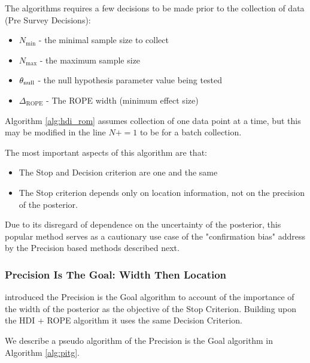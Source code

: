 The algorithms requires a few decisions to be made prior to the collection of data (Pre Survey Decisions):

\begin{itemize}
    \item $N_\mathrm{min}$ - the minimal sample size to collect
    \item $N_\mathrm{max}$ - the maximum sample size
    \item $\theta_{\rm null}$ - the null hypothesis parameter value being tested
    \item $\Delta_\mathrm{ROPE}$ - The ROPE width (minimum effect size)
\end{itemize}

Algorithm \ref{alg:hdi_rom} assumes collection of one data point at a time,
but this may be modified in the line $N += 1$ to be for a batch collection.

The most important aspects of this algorithm are that:

\begin{itemize}
    \item The Stop and Decision criterion are one and the same
    \item The Stop criterion depends only on location information, not on the precision of the posterior.
\end{itemize}

Due to its disregard of dependence on the uncertainty of the posterior,
this popular method serves as a cautionary use case of the "confirmation bias"
address by the Precision based methods described next.


\subsubsection{Precision Is The Goal: Width Then Location}

\cite{kruschke2015doing} introduced the Precision is the Goal algorithm to account
of the importance of the width of the posterior as the objective of the Stop Criterion.
Building upon the HDI + ROPE algorithm it uses the same Decision Criterion.

We describe a pseudo algorithm of the Precision is the Goal algorithm in Algorithm \ref{alg:pitg}.

